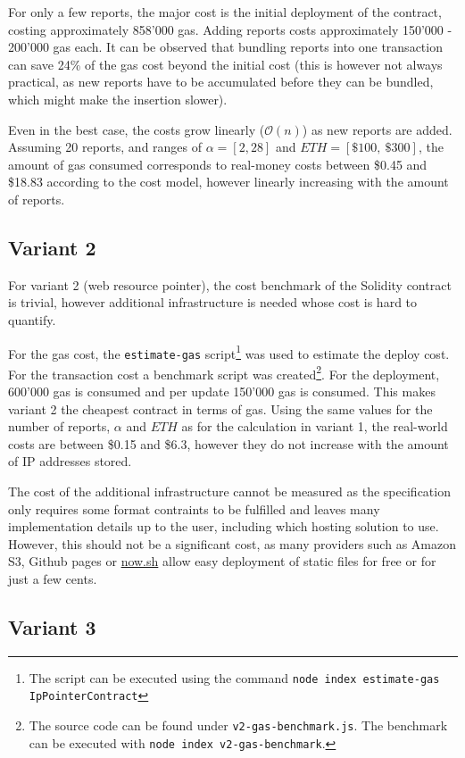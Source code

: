 For only a few reports, the major cost is the initial deployment of the contract, costing approximately 858'000 gas. Adding reports costs approximately 150'000 - 200'000 gas each.
It can be observed that bundling reports into one transaction can save 24\% of the gas cost beyond the initial cost (this is however not always practical, as new reports have to be accumulated before they can be bundled, which might make the insertion slower).

Even in the best case, the costs grow linearly ($\mathcal{O}(n)$) as new reports are added.
Assuming 20 reports, and ranges of $ \alpha = [2, 28]$ and $ ETH = [\$100,\ \$300] $, the amount of gas consumed corresponds to real-money costs between \$0.45 and \$18.83 according to the cost model, however linearly increasing with the amount of reports.

\subsection{Variant 2}
For variant 2 (web resource pointer), the cost benchmark of the Solidity contract is trivial, however additional infrastructure is needed whose cost is hard to quantify.

For the gas cost, the \texttt{estimate-gas} script\footnote{The script can be executed using the command \texttt{node index estimate-gas IpPointerContract}} was used to estimate the deploy cost. For the transaction cost a benchmark script was created\footnote{The source code can be found under \texttt{v2-gas-benchmark.js}. The benchmark can be executed with \texttt{node index v2-gas-benchmark}.}. For the deployment, 600'000 gas is consumed and per update 150'000 gas is consumed. This makes variant 2 the cheapest contract in terms of gas. Using the same values for the number of reports, $ \alpha $ and $ ETH $ as for the calculation in variant 1, the real-world costs are between \$0.15 and \$6.3, however they do not increase with the amount of IP addresses stored.

The cost of the additional infrastructure cannot be measured as the specification only requires some format contraints to be fulfilled and leaves many implementation details up to the user, including which hosting solution to use. However, this should not be a significant cost, as many providers such as Amazon S3, Github pages or \url{now.sh} allow easy deployment of static files for free or for just a few cents.

\subsection{Variant 3}

